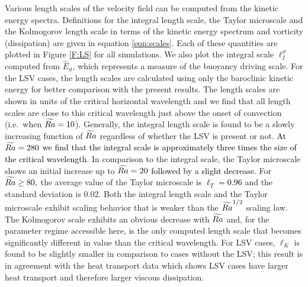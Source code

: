 Various length scales of the velocity field can be computed from the kinetic energy spectra. Definitions for the integral length scale, the Taylor microscale and the Kolmogorov length scale in terms of the kinetic energy spectrum and vorticity (dissipation) are given in equation \eqref{eqn:scales}.
Each of these quantities are plotted in Figure \ref{F:LS} for all simulations. We also plot the integral scale $\ell^\vartheta_I$ computed from  $\widehat {E}_{\vartheta}$, which represents a measure of the buoyancy driving scale. For the LSV cases, the length scales are calculated using only the baroclinic kinetic energy for better comparison with the present results.
The length scales are shown in units of the critical horizontal wavelength and we find that all length scales are close to this critical wavelength just above the onset of convection (i.e.~when $\widetilde{Ra} = 10$). 
Generally, the integral length scale is found to be a slowly increasing function of $\widetilde{Ra}$ regardless of whether the LSV is present or not. 
\textcolor{black}{At $\widetilde{Ra} = 280$ we find that the integral scale is approximately three times the size of the critical wavelength.}
In comparison to the integral scale, the Taylor microscale shows an initial increase up to \textcolor{black}{$\widetilde{Ra}=20$ followed by a slight decrease}. For $\widetilde{Ra} \geq 80,$ the average value of the Taylor microscale is \textcolor{black}{$\ell_{T} = 0.96$} and the standard deviation is $0.02$.
Both the integral length scale and the Taylor microscale exhibit scaling behavior that is weaker than the $\widetilde{Ra}^{1/2}$ scaling law. 
The Kolmogorov scale exhibits an obvious decrease with $\widetilde{Ra}$ and, for the parameter regime accessible here, is the only computed length scale that becomes significantly different in value than the critical wavelength. For LSV cases, $\ell_{K}$ is found to be slightly smaller in comparison to cases without the LSV; this result is in agreement with the heat transport data which shows LSV cases have larger heat transport and therefore larger viscous dissipation. 
